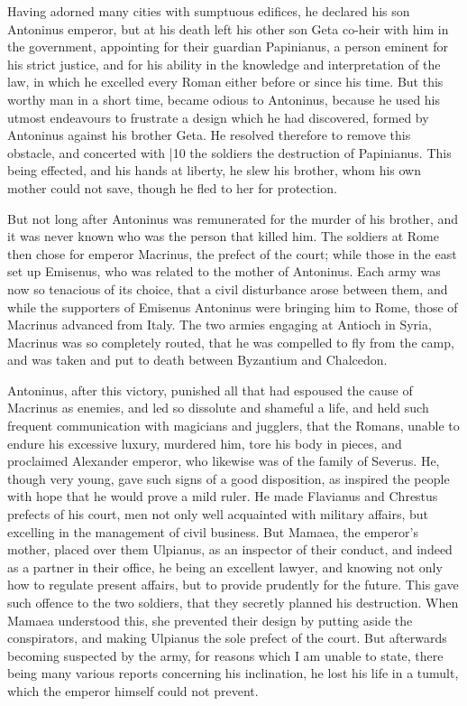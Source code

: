 Having adorned many cities with sumptuous edifices, he declared his son Antoninus emperor, but at his death left his other son Geta co-heir with him in the government, appointing for their guardian Papinianus, a person eminent for his strict justice, and for his ability in the knowledge and interpretation of the law, in which he excelled every Roman either before or since his time. But this worthy man in a short time, became odious to Antoninus, because he used his utmost endeavours to frustrate a design which he had discovered, formed by Antoninus against his brother Geta. He resolved therefore to remove this obstacle, and concerted with
|10 the soldiers the destruction of Papinianus. This being effected, and his hands at liberty, he slew his brother, whom his own mother could not save, though he fled to her for protection.

But not long after Antoninus was remunerated for the murder of his brother, and it was never known who was the person that killed him. The soldiers at Rome then chose for emperor Macrinus, the prefect of the court; while those in the east set up
Emisenus, who was related to the mother of Antoninus. Each army was now so tenacious of its choice, that a civil disturbance arose between them, and while the supporters of Emisenus Antoninus were bringing him to Rome, those of Macrinus advanced from Italy. The two armies engaging at Antioch in Syria, Macrinus was so completely routed, that he was compelled to fly from the camp, and was taken and put to death between Byzantium and Chalcedon.

Antoninus, after this victory, punished all that had espoused the cause of Macrinus as enemies, and led so dissolute and shameful a life, and held such frequent communication with magicians and jugglers, that the Romans, unable to endure his excessive luxury, murdered him, tore his body in pieces, and proclaimed Alexander emperor, who likewise was of the family of Severus. He, though very young, gave such signs of a good disposition, as inspired the people with hope that he would prove a mild ruler. He made Flavianus and Chrestus prefects of his court, men not only well acquainted with military affairs, but excelling in the management of civil business. But Mamaea, the emperor's mother, placed over them Ulpianus, as an inspector of their conduct, and indeed as a partner in their office, he being an excellent lawyer, and knowing not only how to regulate present affairs, but to provide prudently for the future. This gave such offence to the two soldiers, that they secretly planned his destruction. When Mamaea understood this, she prevented their design by putting aside the conspirators, and making Ulpianus the sole prefect of the court. But afterwards becoming suspected by the army, for reasons which I am unable to state, there being many various reports concerning his inclination, he lost his life in a tumult, which the emperor himself could not prevent.

